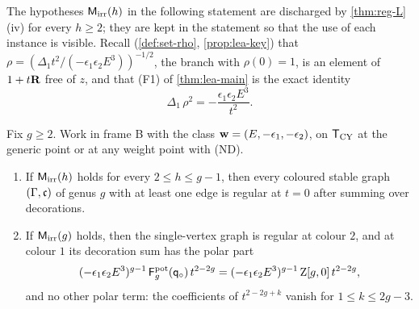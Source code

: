 The hypotheses $\mathsf{M}_{\mathrm{irr}}(h)$ in the following statement are discharged by \cref{thm:reg-L}(iv) for every $h\geq 2$; they are kept in the statement so that the use of each instance is visible. Recall (\cref{def:set-rho}, \cref{prop:lea-key}) that $\rho=(\Delta_1t^2/(-\epsilon_1\epsilon_2E^3))^{-1/2}$, the branch with $\rho(0)=1$, is an element of $1+t\mathbf{R}$ free of $z$, and that (F1) of \cref{thm:lea-main} is the exact identity
\begin{equation}
\label{eq:reg-F1}
\Delta_1\,\rho^2=-\frac{\epsilon_1\epsilon_2E^3}{t^2}.
\end{equation}

\begin{thm}
\label{thm:reg-main}
Fix $g\geq 2$. Work in frame B with the class $\mathbf{w}=(E,-\epsilon_1,-\epsilon_2)$, on $\mathsf{T}_{\mathrm{CY}}$ at the generic point or at any weight point with (ND).
\begin{enumerate}
\item[(a)] If $\mathsf{M}_{\mathrm{irr}}(h)$ holds for every $2\leq h\leq g-1$, then every coloured stable graph $(\Gamma,\mathfrak{c})$ of genus $g$ with at least one edge is regular at $t=0$ after summing over decorations.
\item[(b)] If $\mathsf{M}_{\mathrm{irr}}(g)$ holds, then the single-vertex graph is regular at colour $2$, and at colour $1$ its decoration sum has the polar part
\begin{equation}
\label{eq:reg-pole}
(-\epsilon_1\epsilon_2E^3)^{g-1}\,\mathsf{F}^{\mathrm{pot}}_g(\mathsf{q}_{\circ})\,t^{2-2g}=(-\epsilon_1\epsilon_2E^3)^{g-1}\,\mathrm{Z}[g,0]\,t^{2-2g},
\end{equation}
and no other polar term: the coefficients of $t^{2-2g+k}$ vanish for $1\leq k\leq 2g-3$.
\end{enumerate}
\end{thm}

